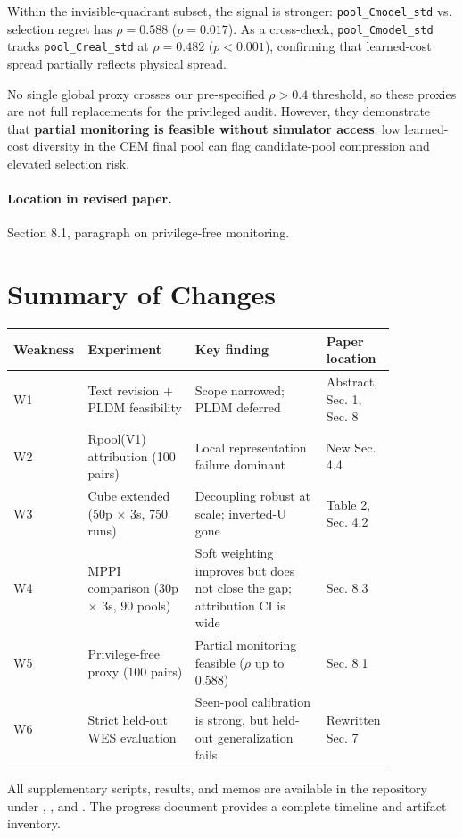 \documentclass[11pt]{article}
\begin{document}
Within the invisible-quadrant subset, the signal is stronger: \texttt{pool\_Cmodel\_std} vs. selection regret has $\rho = 0.588$ ($p = 0.017$). As a cross-check, \texttt{pool\_Cmodel\_std} tracks \texttt{pool\_Creal\_std} at $\rho = 0.482$ ($p < 0.001$), confirming that learned-cost spread partially reflects physical spread.

No single global proxy crosses our pre-specified $\rho > 0.4$ threshold, so these proxies are not full replacements for the privileged audit. However, they demonstrate that \textbf{partial monitoring is feasible without simulator access}: low learned-cost diversity in the CEM final pool can flag candidate-pool compression and elevated selection risk.

\paragraph{Location in revised paper.}
Section 8.1, paragraph on privilege-free monitoring.

\section*{Summary of Changes}

\begin{center}
\footnotesize
\begin{tabular}{@{}>{\raggedright\arraybackslash}p{0.09\linewidth}>{\raggedright\arraybackslash}p{0.27\linewidth}>{\raggedright\arraybackslash}p{0.33\linewidth}>{\raggedright\arraybackslash}p{0.16\linewidth}@{}}
\toprule
Weakness & Experiment & Key finding & Paper location \\
\midrule
W1 & Text revision + PLDM feasibility & Scope narrowed; PLDM deferred & Abstract, Sec. 1, Sec. 8 \\
W2 & Rpool(V1) attribution (100 pairs) & Local representation failure dominant & New Sec. 4.4 \\
W3 & Cube extended (50p $\times$ 3s, 750 runs) & Decoupling robust at scale; inverted-U gone & Table 2, Sec. 4.2 \\
W4 & MPPI comparison (30p $\times$ 3s, 90 pools) & Soft weighting improves but does not close the gap; attribution CI is wide & Sec. 8.3 \\
W5 & Privilege-free proxy (100 pairs) & Partial monitoring feasible ($\rho$ up to 0.588) & Sec. 8.1 \\
W6 & Strict held-out WES evaluation & Seen-pool calibration is strong, but held-out generalization fails & Rewritten Sec. 7 \\
\bottomrule
\end{tabular}
\end{center}

All supplementary scripts, results, and memos are available in the repository under , , and . The progress document  provides a complete timeline and artifact inventory.
\end{document}
